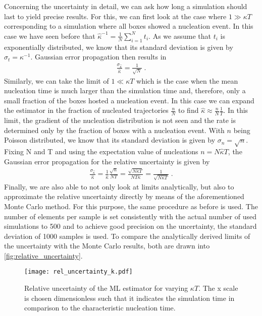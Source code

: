 Concerning the uncertainty in detail, we can ask how long a simulation should last to yield precise results. For this, we can first look at the case where $1 \gg \kappa T$ corresponding to a simulation where all boxes showed a nucleation event. In this case we have seen before that $\hat{\kappa}^{-1} = \frac{1}{N} \sum_{i=1}^N t_i$. As we assume that $t_i$ is exponentially distributed, we know that its standard deviation is given by $\sigma_{t} = \kappa^{-1}$. Gaussian error propagation then results in
\begin{align}
\label{eqn:uncertainty_k_gg}
\frac{\sigma_{\hat{\kappa}}}{\hat{\kappa}} = \frac{1}{\sqrt{N}} \; \text{.}
\end{align}
Similarly, we can take the limit of $1 \ll \kappa T$ which is the case when the mean nucleation time is much larger than the simulation time and, therefore, only a small fraction of the boxes hosted a nucleation event. In this case we can expand the estimator in the fraction of nucleated trajectories $\frac{n}{N}$ to find $\hat{\kappa} \approx \frac{n}{N} \frac{1}{T}$. In this limit, the gradient of the nucleation distribution is not seen and the rate is determined only by the fraction of boxes with a nucleation event. With $n$ being Poisson distributed, we know that its standard deviation is given by $\sigma_n = \sqrt{n}$. Fixing N and T and using the expectation value of nucleations $n = N \hat{\kappa} T$, the Gaussian error propagation for the relative uncertainty is given by 
\begin{align}
\label{eqn:uncertainty_k_ll}
\frac{\sigma_{\hat{\kappa}}}{\hat{\kappa}} = \frac{1}{\hat{\kappa}} \frac{\sqrt{n}}{NT} =\frac{\sqrt{N \hat{\kappa} T}}{N T \hat{\kappa}} =\frac{1}{\sqrt{N \hat{\kappa} T}} \; \text{.}
\end{align}
Finally, we are also able to not only look at limits analytically, but also to approximate the relative uncertainty directly by means of the aforementioned Monte Carlo method. For this purpose, the same procedure as before is used. The number of elements per sample is set consistently with the actual number of used simulations to 500 and to achieve good precision on the uncertainty, the standard deviation of 1000 samples is used. To compare the analytically derived limits of the uncertainty with the Monte Carlo results, both are drawn into \autoref{fig:relative_uncertainty}.
\begin{figure}[ht]
\begin{center}
\texttt{[image: rel\_uncertainty\_k.pdf]}
\caption[Nucleation rate uncertainty depending on measurement time]{Relative uncertainty of the ML estimator for varying $\kappa T$. The x scale is chosen dimensionless such that it indicates the simulation time in comparison to the characteristic nucleation time.}
\label{fig:relative_uncertainty}
\end{center}
\end{figure}

